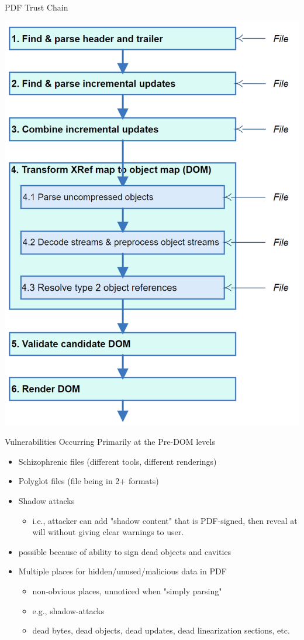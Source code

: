 \documentclass[t,10pt,xcolor={dvipsnames}]{beamer}
\begin{document}
\begin{frame}[label={sec:org18f577c}]{PDF Trust Chain}
\begin{center}
\includegraphics[width=0.47\linewidth]{../figures/Stages.png}
\end{center}
\end{frame}

\begin{frame}[label={sec:org06b9cb6}]{Vulnerabilities Occurring Primarily at the Pre-DOM levels}
\begin{itemize}
\item Schizophrenic files (different tools, different renderings)
\item Polyglot files (file being in 2+ formats)
\item Shadow attacks
\begin{itemize}
\item i.e., attacker can add "shadow content" that is PDF-signed, then reveal
at will without giving clear warnings to user.
\end{itemize}
\end{itemize}

\begin{itemize}
\item possible because of ability to sign \alert{dead objects} and \alert{cavities}
\end{itemize}
\begin{itemize}
\item Multiple places for hidden/unused/malicious data in PDF
\begin{itemize}
\item non-obvious places, unnoticed when "simply parsing"
\item e.g., shadow-attacks
\item dead bytes, dead objects, dead updates, dead linearization sections, etc.
\end{itemize}
\end{itemize}
\end{frame}
\end{document}
